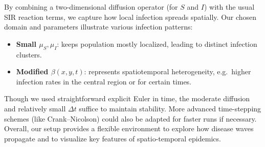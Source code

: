 




By combining a two-dimensional diffusion operator (for $S$ and $I$) with the usual SIR reaction terms, we capture how local infection spreads spatially. Our chosen domain and parameters illustrate various infection patterns:
\begin{itemize}
  \item \textbf{Small \(\mu_S,\mu_I\)}: keeps population mostly localized, leading to distinct infection clusters.
  \item \textbf{Modified \(\beta(x,y,t)\)}: represents spatiotemporal heterogeneity, e.g.\ higher infection rates in the central region or for certain times.
\end{itemize}
Though we used straightforward explicit Euler in time, the moderate diffusion and relatively small \(\Delta t\) suffice to maintain stability. More advanced time-stepping schemes (like Crank--Nicolson) could also be adapted for faster runs if necessary. Overall, our setup provides a flexible environment to explore how disease waves propagate and to visualize key features of spatio-temporal epidemics.